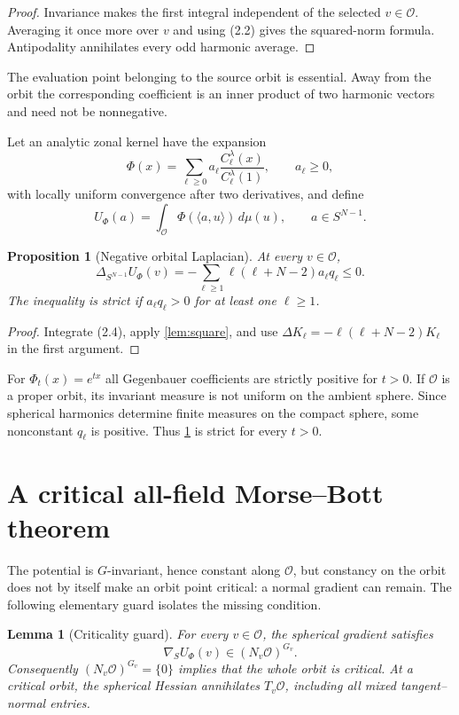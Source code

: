 \documentclass[11pt]{article}
\newtheorem{lemma}[theorem]{Lemma}
\newtheorem{proposition}[theorem]{Proposition}
\newcommand{\cO}{\mathcal O}
\newcommand{\ip}[2]{\langle #1,#2\rangle}
\begin{document}
\begin{proof}
Invariance makes the first integral independent of the selected $v\in\cO$.
Averaging it once more over $v$ and using (2.2) gives the squared-norm
formula.  Antipodality annihilates every odd harmonic average.
\end{proof}

The evaluation point belonging to the source orbit is essential.  Away from
the orbit the corresponding coefficient is an inner product of two harmonic
vectors and need not be nonnegative.

Let an analytic zonal kernel have the expansion
\[
 \Phi(x)=\sum_{\ell\ge0}a_\ell
 \frac{C_\ell^\lambda(x)}{C_\ell^\lambda(1)},\qquad a_\ell\ge0,              \tag{2.4}
\]
with locally uniform convergence after two derivatives, and define
\[
 U_\Phi(a)=\int_\cO\Phi(\ip{a}{u})\,d\mu(u),\qquad a\in S^{N-1}.             \tag{2.5}
\]

\begin{proposition}[Negative orbital Laplacian]\label{prop:lap}
At every $v\in\cO$,
\[
 \Delta_{S^{N-1}}U_\Phi(v)
 =-\sum_{\ell\ge1}\ell(\ell+N-2)a_\ell q_\ell\le0.        \tag{2.6}
\]
The inequality is strict if $a_\ell q_\ell>0$ for at least one
$\ell\ge1$.
\end{proposition}

\begin{proof}
Integrate (2.4), apply \cref{lem:square}, and use
$\Delta K_\ell=-\ell(\ell+N-2)K_\ell$ in the first argument.
\end{proof}

For $\Phi_t(x)=e^{tx}$ all Gegenbauer coefficients are strictly positive for
$t>0$.  If $\cO$ is a proper orbit, its invariant measure is not uniform on
the ambient sphere.  Since spherical harmonics determine finite measures on
the compact sphere, some nonconstant $q_\ell$ is positive.  Thus
\cref{prop:lap} is strict for every $t>0$.

\section{A critical all-field Morse--Bott theorem}

The potential is $G$-invariant, hence constant along $\cO$, but constancy on
the orbit does not by itself make an orbit point critical: a normal gradient
can remain.  The following elementary guard isolates the missing condition.

\begin{lemma}[Criticality guard]\label{lem:critical}
For every $v\in\cO$, the spherical gradient satisfies
\[
 \nabla_S U_\Phi(v)\in (N_v\cO)^{G_v}.                       \tag{3.1}
\]
Consequently $(N_v\cO)^{G_v}=\{0\}$ implies that the whole orbit is critical.
At a critical orbit, the spherical Hessian annihilates $T_v\cO$, including
all mixed tangent--normal entries.
\end{lemma}
\end{document}
